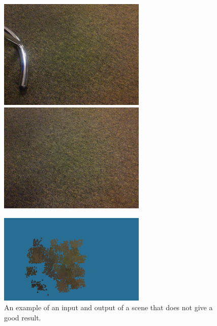 \begin{figure}[h]
\centerline{
\includegraphics[width=7.0cm]{img/bad_input1.png}
\includegraphics[width=7.0cm]{img/bad_input2.png}}
\centerline{
\includegraphics[width=7.0cm]{img/bad_result.png}}

\caption{An example of an input and output of a scene that does not give a good result.}
\label{fig:bad_example}
\end{figure}


